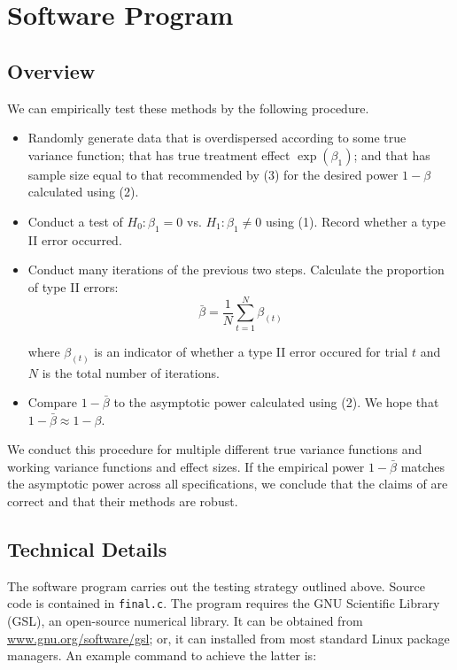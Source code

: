 \documentclass{article}
\begin{document}
\section{Software Program}

\subsection{Overview}

We can empirically test these methods by the following procedure.

\begin{itemize}
	\item Randomly generate data that is overdispersed according to some
		true variance function; that has true treatment
		effect $\exp{(\beta_1)}$; and that has sample size equal to that
		recommended by (3) for the desired power $1-\beta$ calculated
		using (2).
	\item Conduct a test of $H_0: \beta_1 = 0$ vs. $H_1: \beta_1 \neq 0$
		using (1). Record whether a type II error occurred.
	\item Conduct many iterations of the previous two steps.
		Calculate the proportion of type II errors:
		$$
		\bar{\beta} = \frac{1}{N}\sum_{t = 1}^N \beta_{(t)}
		$$

		where $\beta_{(t)}$ is an indicator of whether a type II error
		occured for trial $t$ and $N$ is the total number of iterations.
	\item Compare $1-\bar{\beta}$ to the asymptotic power calculated using (2). We
		hope that $1-\bar{\beta} \approx 1 - \beta$.
\end{itemize}

We conduct this procedure for multiple different true variance functions and
working variance functions and effect sizes. If the empirical power $1 - \bar{\beta}$ 
matches the asymptotic power across all specifications, we conclude that the claims of
\cite{igeta2018} are correct and that their methods are robust.

\subsection{Technical Details}

The software program carries out the testing strategy outlined above. Source code is contained in \texttt{final.c}. 
The program requires the GNU Scientific Library (GSL), an
open-source numerical library. It can be obtained from
\url{www.gnu.org/software/gsl}; or, it can installed from most standard Linux
package managers. An example command to achieve the latter is:
\end{document}
